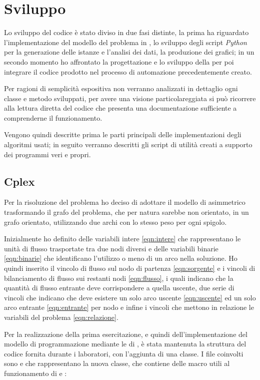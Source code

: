\section{Sviluppo}
Lo sviluppo del codice è stato diviso in due fasi distinte, la prima ha riguardato l'implementazione del modello del problema in , lo sviluppo degli script \emph{Python} per la generazione delle istanze e l'analisi dei dati, la produzione dei grafici; in un secondo momento ho affrontato la progettazione e lo sviluppo della \tabu per poi integrare il codice prodotto nel processo di automazione precedentemente creato.

Per ragioni di semplicità espositiva non verranno analizzati in dettaglio ogni classe e metodo sviluppati, per avere una visione particolareggiata si può ricorrere alla lettura diretta del codice che presenta una documentazione sufficiente a comprenderne il funzionamento.

Vengono quindi descritte prima le parti principali delle implementazioni degli algoritmi usati; in seguito verranno descritti gli script di utilità creati a supporto dei programmi veri e propri.

\subsection{Cplex}
Per la risoluzione del problema ho deciso di adottare il modello di  asimmetrico trasformando il grafo del problema, che per natura sarebbe non orientato, in un grafo orientato, utilizzando due archi con lo stesso peso per ogni spigolo.

Inizialmente ho definito delle variabili intere \eqref{eqn:intere} che rappresentano le unità di flusso trasportate tra due nodi diversi e delle variabili binarie \eqref{eqn:binarie} che identificano l'utilizzo o meno di un arco nella soluzione.
Ho quindi inserito il vincolo di flusso sul nodo di partenza \eqref{eqn:sorgente} e i vincoli di bilanciamento di flusso sui restanti nodi \eqref{eqn:flusso}, i quali indicano che la quantità di flusso entrante deve corrispondere a quella uscente, due serie di vincoli che indicano che deve esistere un solo arco uscente \eqref{eqn:uscente} ed un solo arco entrante \eqref{eqn:entrante} per nodo e infine i vincoli che mettono in relazione le variabili del problema \eqref{eqn:relazione}.

Per la realizzazione della prima esercitazione, e quindi dell'implementazione del modello di programmazione mediante le  di , è stata mantenuta la struttura del codice fornita durante i laboratori, con l'aggiunta di una classe.
I file coinvolti sono  e  che rappresentano la nuova classe,  che contiene delle macro utili al funzionamento di  e :

